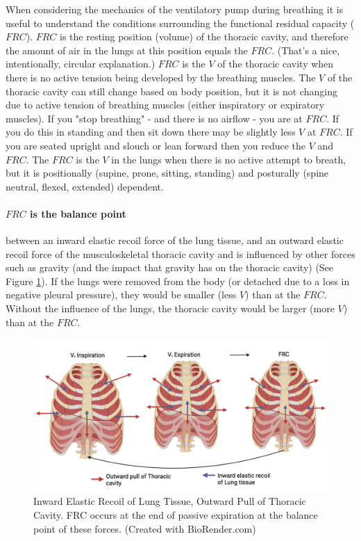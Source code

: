 When considering the mechanics of the ventilatory pump during breathing it is useful to understand the conditions surrounding the functional residual capacity ($FRC$). $FRC$ is the resting position (volume) of the thoracic cavity, and therefore the amount of air in the lungs at this position equals the $FRC$. (That's a nice, intentionally, circular explanation.) 
$FRC$ is the $V$ of the thoracic cavity when there is no active tension being developed by the breathing muscles. The $V$ of the thoracic cavity can still change based on body position, but it is not changing due to active tension of breathing muscles (either inspiratory or expiratory muscles). If you "stop breathing" - and there is no airflow - you are at $FRC$. If you do this in standing and then sit down there may be slightly less $V$ at $FRC$. If you are seated upright and slouch or lean forward then you reduce the $V$ and $FRC$. The $FRC$ is the $V$ in the lungs when there is no active attempt to breath, but it is positionally (supine, prone, sitting, standing) and posturally (spine neutral, flexed, extended) dependent.

\paragraph{$FRC$ is the balance point} between an inward elastic recoil force of the lung tissue, and an outward elastic recoil force of the musculoskeletal thoracic cavity and is influenced by other forces such as gravity (and the impact that gravity has on the thoracic cavity) (See Figure \ref{fig:frc}). If the lungs were removed from the body (or detached due to a loss in negative pleural pressure), they would be smaller (less $V$) than at the $FRC$. Without the influence of the lungs, the thoracic cavity would be larger (more $V$) than at the $FRC$. 



\begin{figure}[!h]
    \centering
    \includegraphics[width = 1.0 \linewidth]{./figure/ventilation/frc.png}
    \caption{Inward Elastic Recoil of Lung Tissue, Outward Pull of Thoracic Cavity. FRC occurs at the end of passive expiration at the balance point of these forces. \footnotesize{(Created with BioRender.com)}  }
    \label{fig:frc}
\end{figure}

